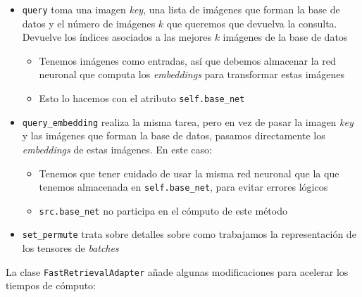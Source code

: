 \begin{itemize}
    \item \lstinline{query} toma una imagen \textit{key}, una lista de imágenes que forman la base de datos y el número de imágenes $k$ que queremos que devuelva la consulta. Devuelve los índices asociados a las mejores $k$ imágenes de la base de datos
        \begin{itemize}
            \item Tenemos imágenes como entradas, así que debemos almacenar la red neuronal que computa los \textit{embeddings} para transformar estas imágenes
            \item Esto lo hacemos con el atributo \lstinline{self.base_net}
        \end{itemize}
    \item \lstinline{query_embedding} realiza la misma tarea, pero en vez de pasar la imagen \textit{key} y las imágenes que forman la base de datos, pasamos directamente los \textit{embeddings} de estas imágenes. En este caso:
        \begin{itemize}
            \item Tenemos que tener cuidado de usar la misma red neuronal que la que tenemos almacenada en \lstinline{self.base_net}, para evitar errores lógicos
            \item \lstinline{src.base_net} no participa en el cómputo de este método
        \end{itemize}
    \item \lstinline{set_permute} trata sobre detalles sobre como trabajamos la representación de los tensores de \textit{batches}
\end{itemize}

La clase \lstinline{FastRetrievalAdapter} añade algunas modificaciones para acelerar los tiempos de cómputo:


